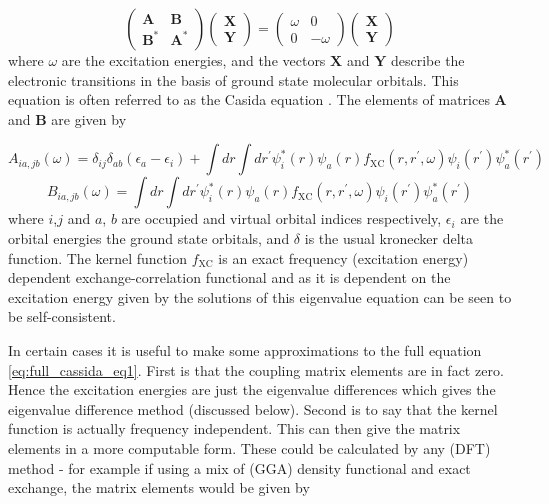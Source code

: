 \begin{equation}
\label{eq:full_cassida_eq1}
\left(\begin{matrix}
\mathbf{A} & \mathbf{B} \\
\mathbf{B^*} & \mathbf{A^*}
\end{matrix}\right)
\left(\begin{matrix}
\mathbf{X}\\
\mathbf{Y}
\end{matrix}\right)
=
\left(\begin{matrix}
\omega & 0\\
0 & -\omega
\end{matrix}\right)
\left(\begin{matrix}
\mathbf{X}\\
\mathbf{Y}
\end{matrix}\right)
\end{equation}
%
where $\omega$ are the excitation energies, and the vectors $\mathbf{X}$ and $\mathbf{Y}$ 
describe the electronic transitions in the basis of ground state molecular orbitals.
This equation is often referred to as the Casida equation \cite{Casida1995}. The
elements of matrices $\mathbf{A}$ and $\mathbf{B}$ are given by

\begin{equation}
A_{ia,jb}\left(\omega\right) = \delta_{ij}\delta_{ab}\left(\epsilon_a - \epsilon_i\right) + \int dr \int dr^\prime \psi_i^*\left(r\right) \psi_a\left(r\right) f_{\text{XC}}\left(r, r^\prime, \omega\right) \psi_i\left(r^\prime\right) \psi_a^*\left(r^\prime\right)
\end{equation}
%
\begin{equation}
B_{ia,jb}\left(\omega\right) = \int dr \int dr^\prime \psi_i^*\left(r\right) \psi_a\left(r\right) f_{\text{XC}}\left(r, r^\prime, \omega\right) \psi_i\left(r^\prime\right) \psi_a^*\left(r^\prime\right)
\end{equation}
%
where $i$,$j$ and $a$, $b$ are occupied and virtual orbital indices respectively, $\epsilon_i$
are the orbital energies the ground state orbitals, and $\delta$ is the usual kronecker 
delta function. The kernel function $f_{\text{XC}}$ is an exact frequency (excitation energy) 
dependent exchange-correlation functional and as it is dependent on the excitation 
energy given by the solutions of this eigenvalue equation can be seen to be self-consistent.

In certain cases it is useful to make some approximations to the full equation \ref{eq:full_cassida_eq1}. 
First is that the coupling matrix elements are in fact zero. Hence the excitation 
energies are just the eigenvalue differences which gives the eigenvalue difference 
method (discussed below). Second is to say that the kernel function is actually
frequency independent. This can then give the matrix elements in a more computable
form. These could be calculated by any (DFT) method - for example if using a mix
of (GGA) density functional and exact exchange, the matrix elements would be given 
by

